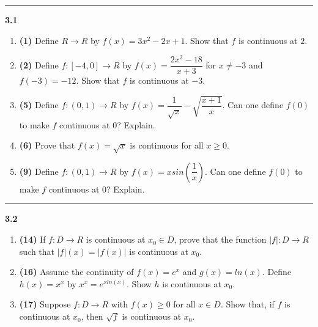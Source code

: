 \documentclass[fleqn]{article}
\begin{document}
  \rule{15cm}{2pt}

  \textbf{3.1}
  \begin{enumerate}
    \item \textbf{(1)} Define $R \longrightarrow R$ by $f(x)=3x^2-2x+1$. Show that $f$ is continuous at $2$.

        


    \item \textbf{(2)} Define $f: [-4, 0] \longrightarrow R$ by $f(x)=\dfrac{2x^2-18}{x+3}$ for $x \neq -3$ and $f(-3)=-12$. Show 
    that $f$ is continuous at $-3$.

        


    \item \textbf{(5)} Define $f: (0, 1) \longrightarrow R$ by $f(x)=\dfrac{1}{\sqrt{x}}-\sqrt{\dfrac{x+1}{x}}$. Can one define
    $f(0)$ to make $f$ continuous at $0$? Explain. 

        


    \item \textbf{(6)} Prove that $f(x)=\sqrt{x}$ is continuous for all $x \geq 0$.

        
    

    \item \textbf{(9)} Define $f: (0, 1) \longrightarrow R$ by $f(x)=x sin(\dfrac{1}{x})$. Can one define
    $f(0)$ to make $f$ continuous at $0$? Explain.

        

  \end{enumerate}  

  \rule{15cm}{2pt}

  \textbf{3.2}
  \begin{enumerate}
    \item \textbf{(14)} If $f: D \longrightarrow R$ is continuous at $x_0 \in D$, prove that the function $|f|: D \longrightarrow R$
    such that $|f|(x)=|f(x)|$ is continuous at $x_0$.

        


    \item \textbf{(16)} Assume the continuity of $f(x)=e^x$ and $g(x)=ln(x)$. Define $h(x)=x^x$ by $x^x=e^{x ln(x)}$. Show $h$ is continuous
    at $x_0$.

        
    

    \item \textbf{(17)} Suppose $f: D \longrightarrow R$ with $f(x) \geq 0$ for all $x \in D$. Show that, if $f$ is continuous at $x_0$, then
    $\sqrt{f}$ is continuous at $x_0$.

        

  \end{enumerate}
\end{document}
